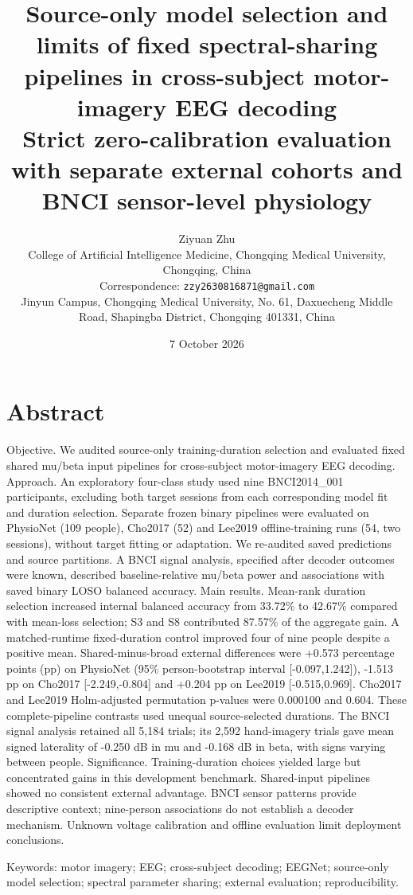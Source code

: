 \documentclass[11pt]{article}
\title{Source-only model selection and limits of fixed spectral-sharing pipelines in cross-subject motor-imagery EEG decoding\\\large Strict zero-calibration evaluation with separate external cohorts and BNCI sensor-level physiology}
\author{Ziyuan Zhu\\\small College of Artificial Intelligence Medicine, Chongqing Medical University, Chongqing, China\\\small Correspondence: \texttt{zzy2630816871@gmail.com}\\\small Jinyun Campus, Chongqing Medical University, No. 61, Daxuecheng Middle Road, Shapingba District, Chongqing 401331, China}
\date{7 October 2026}
\begin{document}
\maketitle
\section*{Abstract}
Objective. We audited source-only training-duration selection and evaluated fixed shared mu/beta input pipelines for cross-subject motor-imagery EEG decoding. Approach. An exploratory four-class study used nine BNCI2014\_001 participants, excluding both target sessions from each corresponding model fit and duration selection. Separate frozen binary pipelines were evaluated on PhysioNet (109 people), Cho2017 (52) and Lee2019 offline-training runs (54, two sessions), without target fitting or adaptation. We re-audited saved predictions and source partitions. A BNCI signal analysis, specified after decoder outcomes were known, described baseline-relative mu/beta power and associations with saved binary LOSO balanced accuracy. Main results. Mean-rank duration selection increased internal balanced accuracy from 33.72\% to 42.67\% compared with mean-loss selection; S3 and S8 contributed 87.57\% of the aggregate gain. A matched-runtime fixed-duration control improved four of nine people despite a positive mean. Shared-minus-broad external differences were +0.573 percentage points (pp) on PhysioNet (95\% person-bootstrap interval [-0.097,1.242]), -1.513 pp on Cho2017 [-2.249,-0.804] and +0.204 pp on Lee2019 [-0.515,0.969]. Cho2017 and Lee2019 Holm-adjusted permutation p-values were 0.000100 and 0.604. These complete-pipeline contrasts used unequal source-selected durations. The BNCI signal analysis retained all 5,184 trials; its 2,592 hand-imagery trials gave mean signed laterality of -0.250 dB in mu and -0.168 dB in beta, with signs varying between people. Significance. Training-duration choices yielded large but concentrated gains in this development benchmark. Shared-input pipelines showed no consistent external advantage. BNCI sensor patterns provide descriptive context; nine-person associations do not establish a decoder mechanism. Unknown voltage calibration and offline evaluation limit deployment conclusions.

Keywords: motor imagery; EEG; cross-subject decoding; EEGNet; source-only model selection; spectral parameter sharing; external evaluation; reproducibility.
\end{document}
